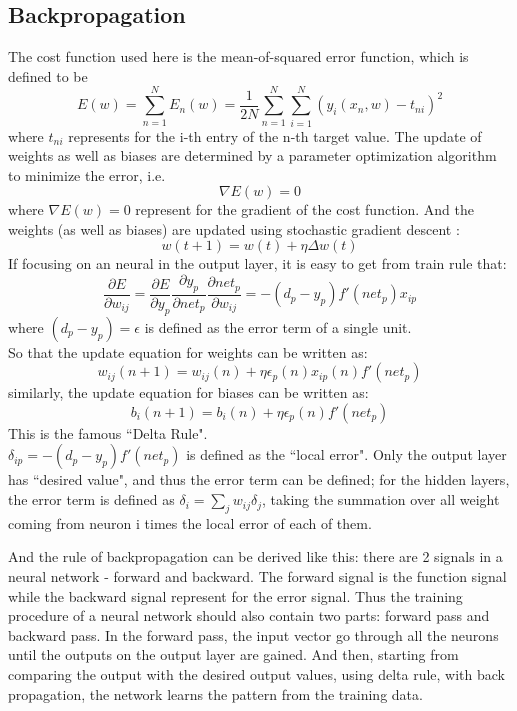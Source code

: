\documentclass[conference]{IEEEtran}
\begin{document}
\subsection {Backpropagation} The cost function used here is the mean-of-squared error function, which is defined to be 
$$E(w)= \sum_{n=1}^N E_n(w) = \displaystyle\frac{1}{2N}\sum_{n=1}^N\sum_{i=1}^N(y_i(x_n,w)-t_{ni})^2$$
where $t_{ni}$ represents for the i-th entry of the n-th target value. The update of weights as well as biases are determined by a parameter optimization algorithm to minimize the error\cite{b6}, i.e. 
$$\nabla E(w) = 0$$
where $\nabla E(w) = 0$ represent for the gradient of the cost function. And the weights (as well as biases) are updated using stochastic gradient descent :
$$w(t+1) = w(t)+\eta \Delta w(t)$$
If focusing on an neural in the output layer, it is easy to get from train rule that:
$$\frac{\partial{E}}{\partial{w_{ij}}} = \frac{\partial{E}}{\partial{y_p}}\frac{\partial{y_p}}{\partial{net_p}} \frac{\partial{net_p}}{\partial{w_{ij}}} =-(d_p-y_p)f'(net_p)x_{ip}$$
where $(d_p-y_p) = \epsilon$ is defined as the error term of a single unit.\\
So that the update equation for weights can be written as:
$$w_{ij}(n+1) = w_{ij}(n)+\eta \epsilon_p(n)x_{ip}(n)f'(net_p)$$
similarly, the update equation for biases can be written as:
$$b_i(n+1) = b_i(n)+\eta \epsilon_p(n)f'(net_p)$$
This is the famous ``Delta Rule".\\
$\delta_{ip} = -(d_p-y_p)f'(net_p)$ is defined as the ``local error". Only the output layer has ``desired value", and thus the error term can be defined; for the hidden layers, the error term is defined as $\delta_i = \sum_j w_{ij}\delta_j$, taking the summation over all weight coming from neuron i times the local error of each of them.

And the rule of backpropagation can be derived like this: there are 2 signals in a neural network - forward and backward. The forward signal is the function signal while the backward signal represent for the error signal. Thus the training procedure of a neural network should also contain two parts: forward pass and backward pass. In the forward pass, the input vector go through all the neurons until the outputs on the output layer are gained. And then, starting from comparing the output with the desired output values, using delta rule, with back propagation, the network learns the pattern from the training data. 
\end{document}
